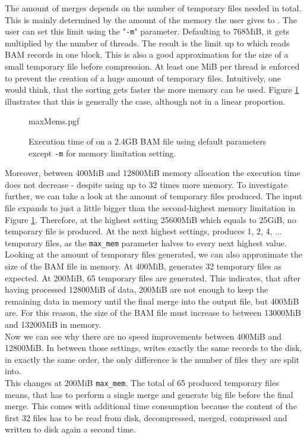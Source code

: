 The amount of merges depends on the number of temporary files needed in total. This is mainly determined by the amount of the memory the user gives to \sort. The user can set this limit using the "\texttt{-m}" parameter. Defaulting to 768MiB, it gets multiplied by the number of threads. The result is the limit up to which \sort reads BAM records in one block. This is also a good approximation for the size of a small temporary file before compression. At least one MiB per thread is enforced to prevent the creation of a huge amount of temporary files. Intuitively, one would think, that the sorting gets faster the more memory can be used. Figure \ref{fig:maxMems} illustrates that this is generally the case, although not in a linear proportion.
\begin{figure}
        {maxMems.pgf}
    \caption{Execution time of \sort on a 2.4GB BAM file using default parameters except \texttt{-m} for memory limitation setting. }
    \label{fig:maxMems}
\end{figure}
Moreover, between 400MiB and 12800MiB memory allocation the execution time does not decrease - despite \sort using up to 32 times more memory. To investigate further, we can take a look at the amount of temporary files produced. The input file expands to just a little bigger than the second-highest memory limitation in Figure \ref{fig:maxMems}. Therefore, at the highest setting 25600MiB which equals to 25GiB, no temporary file is produced. At the next highest settings, \sort produces 1, 2, 4, ... temporary files, as the \texttt{max\_mem} parameter halves to every next highest value. Looking at the amount of temporary files generated, we can also approximate the size of the BAM file in memory. At 400MiB, \sort generates 32 temporary files as expected. At 200MiB, 65 temporary files are generated. This indicates, that after having processed 12800MiB of data, 200MiB are not enough to keep the remaining data in memory until the final merge into the output file, but 400MiB are. For this reason, the size of the BAM file must increase to between 13000MiB and 13200MiB in memory. \\
Now we can see why there are no speed improvements between 400MiB and 12800MiB. In between those settings, \sort writes exactly the same records to the disk, in exactly the same order, the only difference is the number of files they are split into. \\
This changes at 200MiB \texttt{max\_mem}. The total of 65 produced temporary files means, that \sort has to perform a single merge and generate big file before the final merge. This comes with additional time consumption because the content of the first 32 files has to be read from disk, decompressed, merged, compressed  and written to disk again a second time. \\
